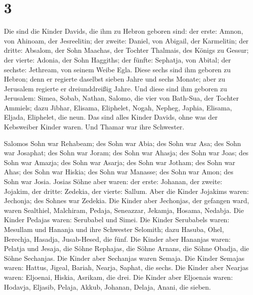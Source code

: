 \hypertarget{section-2}{%
\section{3}\label{section-2}}

 Die sind die Kinder Davids, die ihm zu Hebron geboren sind:
der erste: Amnon, von Ahinoam, der Jesreelitin; der zweite: Daniel, von
Abigail, der Karmelitin;  der dritte: Absalom, der Sohn
Maachas, der Tochter Thalmais, des Königs zu Gessur; der vierte: Adonia,
der Sohn Haggiths;  der fünfte: Sephatja, von Abital; der
sechste: Jethream, von seinem Weibe Egla.  Diese sechs sind
ihm geboren zu Hebron; denn er regierte daselbst sieben Jahre und sechs
Monate; aber zu Jerusalem regierte er dreiunddreißig Jahre. 
Und diese sind ihm geboren zu Jerusalem: Simea, Sobab, Nathan, Salomo,
die vier von Bath-Sua, der Tochter Ammiels;  dazu Jibhar,
Elisama, Eliphelet,  Nogah, Nepheg, Japhia, 
Elisama, Eljada, Eliphelet, die neun.  Das sind alles Kinder
Davids, ohne was der Kebsweiber Kinder waren. Und Thamar war ihre
Schwester.

 Salomos Sohn war Rehabeam; des Sohn war Abia; des Sohn war
Asa; des Sohn war Josaphat;  des Sohn war Joram; des Sohn
war Ahasja; des Sohn war Joas;  des Sohn war Amazja; des
Sohn war Asarja; des Sohn war Jotham;  des Sohn war Ahas;
des Sohn war Hiskia; des Sohn war Manasse;  des Sohn war
Amon; des Sohn war Josia.  Josias Söhne aber waren: der
erste: Johanan, der zweite: Jojakim, der dritte: Zedekia, der vierte:
Sallum.  Aber die Kinder Jojakims waren: Jechonja; des
Sohnes war Zedekia.  Die Kinder aber Jechonjas, der
gefangen ward, waren Sealthiel,  Malchiram, Pedaja,
Seneazzar, Jekamja, Hosama, Nedabja.  Die Kinder Pedajas
waren: Serubabel und Simei. Die Kinder Serubabels waren: Mesullam und
Hananja und ihre Schwester Selomith;  dazu Hasuba, Ohel,
Berechja, Hasadja, Jusab-Hesed, die fünf.  Die Kinder aber
Hananjas waren: Pelatja und Jesaja, die Söhne Rephajas, die Söhne
Arnans, die Söhne Obadja, die Söhne Sechanjas.  Die Kinder
aber Sechanjas waren Semaja. Die Kinder Semajas waren: Hattus, Jigeal,
Bariah, Nearja, Saphat, die sechs.  Die Kinder aber Nearjas
waren: Eljoenai, Hiskia, Asrikam, die drei.  Die Kinder
aber Eljoenais waren: Hodavja, Eljasib, Pelaja, Akkub, Johanan, Delaja,
Anani, die sieben.

